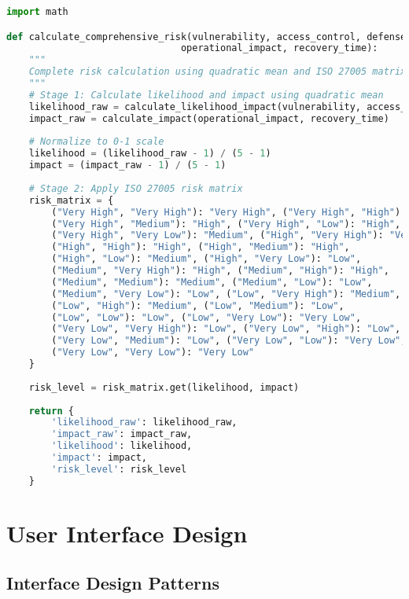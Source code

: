 \documentclass[binding=0.6cm]{sapthesis}
\begin{document}
\begin{lstlisting}[language=Python, caption=Complete Risk Calculation Implementation]
import math

def calculate_comprehensive_risk(vulnerability, access_control, defense_capability, 
                               operational_impact, recovery_time):
    """
    Complete risk calculation using quadratic mean and ISO 27005 matrix
    """
    # Stage 1: Calculate likelihood and impact using quadratic mean
    likelihood_raw = calculate_likelihood_impact(vulnerability, access_control, defense_capability)
    impact_raw = calculate_impact(operational_impact, recovery_time)
    
    # Normalize to 0-1 scale
    likelihood = (likelihood_raw - 1) / (5 - 1)
    impact = (impact_raw - 1) / (5 - 1)
    
    # Stage 2: Apply ISO 27005 risk matrix
    risk_matrix = {
        ("Very High", "Very High"): "Very High", ("Very High", "High"): "Very High",
        ("Very High", "Medium"): "High", ("Very High", "Low"): "High",
        ("Very High", "Very Low"): "Medium", ("High", "Very High"): "Very High",
        ("High", "High"): "High", ("High", "Medium"): "High",
        ("High", "Low"): "Medium", ("High", "Very Low"): "Low",
        ("Medium", "Very High"): "High", ("Medium", "High"): "High",
        ("Medium", "Medium"): "Medium", ("Medium", "Low"): "Low",
        ("Medium", "Very Low"): "Low", ("Low", "Very High"): "Medium",
        ("Low", "High"): "Medium", ("Low", "Medium"): "Low",
        ("Low", "Low"): "Low", ("Low", "Very Low"): "Very Low",
        ("Very Low", "Very High"): "Low", ("Very Low", "High"): "Low",
        ("Very Low", "Medium"): "Low", ("Very Low", "Low"): "Very Low",
        ("Very Low", "Very Low"): "Very Low"
    }
    
    risk_level = risk_matrix.get(likelihood, impact)
    
    return {
        'likelihood_raw': likelihood_raw,
        'impact_raw': impact_raw,
        'likelihood': likelihood,
        'impact': impact,
        'risk_level': risk_level
    }
\end{lstlisting}

\section{User Interface Design}

\subsection{Interface Design Patterns}
\end{document}
